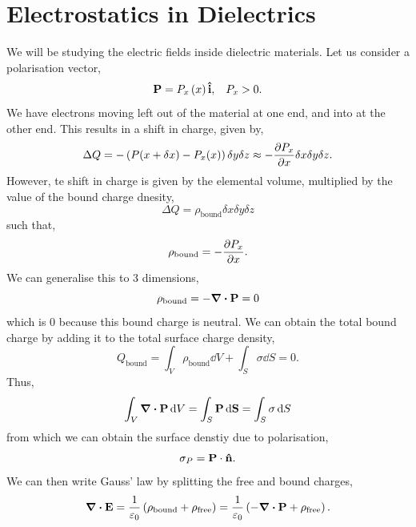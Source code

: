 \documentclass{book}
\begin{document}
\section{Electrostatics in Dielectrics}
We will be studying the electric fields inside dielectric materials. Let us consider a polarisation vector,
\begin{equation}
	\vb{P} = P_x\left(x\right)\vu{i}, \hspace{0.3cm} P_x > 0.
\end{equation}
We have electrons moving left out of the material at one end, and into at the other end. This results in a shift in charge, given by,
\begin{equation}
	\Delta Q = -\left(P(x + \delta x) - P_x(x)\right)\delta y \delta z \approx -\pdv{P_x}{x} \delta x \delta y \delta z.
\end{equation}
However, te shift in charge is given by the elemental volume, multiplied by the value of the bound charge dnesity,
\begin{equation}
	\Delta Q = \rho_{\text{bound}} \delta x \delta y \delta z
\end{equation}
such that,
\begin{equation}
	\rho_{\text{bound}} = -\pdv{P_x}{x}.
\end{equation}
We can generalise this to 3 dimensions,
\begin{equation}
	\rho_{\text{bound}} = -\div{\vb{P}} = 0
\end{equation}
which is 0 because this bound charge is neutral. We can obtain the total bound charge by adding it to the total surface charge density,
\begin{equation}
	Q_{\text{bound}} = \int_V\rho_{\text{bound}}\dd{V} + \int_S\sigma\dd{S} = 0.
\end{equation}
Thus,
\begin{equation}
	\int_V \div{\vb{P}}\dd{V} = \int_S\vb{P}\dd{\vb{S}} = \int_{S} \sigma \dd{S}
\end{equation}
from which we can obtain the surface denstiy due to polarisation,
\begin{equation}
	\sigma_P = \vb{P} \cdot\vu{n}.
\end{equation}
We can then write Gauss' law by splitting the free and bound charges,
\begin{equation}
	\div{\vb{E}} = \frac{1}{\varepsilon_0}\left(\rho_{\text{bound}} + \rho_{\text{free}}\right) = \frac{1}{\varepsilon_0}\left(-\div{\vb{P}} + \rho_{\text{free}}\right). \label{eq:fkjhdsal}
\end{equation}
\end{document}
